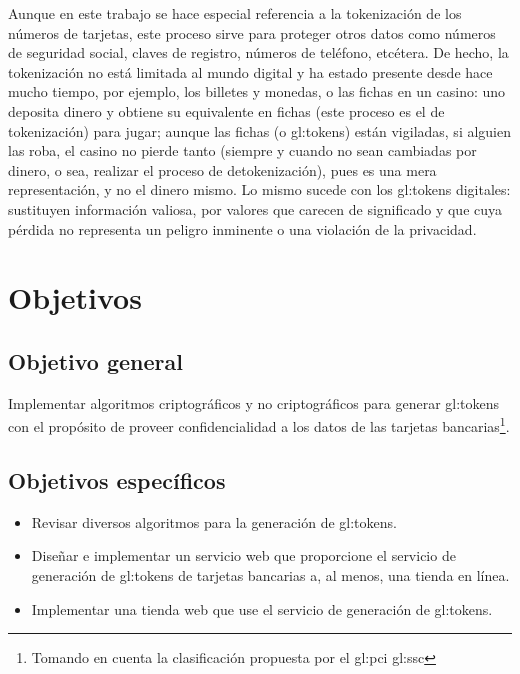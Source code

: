 Aunque en este trabajo se hace especial referencia a la tokenización de los
números de tarjetas, este proceso sirve para proteger otros datos como números
de seguridad social, claves de registro, números de teléfono, etcétera. De
hecho, la tokenización no está limitada al mundo digital y ha estado presente
desde hace mucho tiempo, por ejemplo, los billetes y monedas, o las fichas en
un casino: uno deposita dinero y obtiene su equivalente en fichas (este proceso
es el de tokenización) para jugar; aunque las fichas (o \glspl{gl:token}) están
vigiladas, si alguien las roba, el casino no pierde tanto (siempre y cuando no
sean cambiadas por dinero, o sea, realizar el proceso de detokenización), pues
es una mera representación, y no el dinero mismo. Lo mismo sucede con los
\glspl{gl:token} digitales: sustituyen información valiosa, por valores que
carecen de significado y que cuya pérdida no representa un peligro inminente o
una violación de la privacidad.

\section{Objetivos}

\subsection{Objetivo general}

Implementar algoritmos criptográficos y no criptográficos para generar
\glspl{gl:token} con el propósito de proveer confidencialidad a los datos de las
tarjetas bancarias\footnote{Tomando en cuenta la clasificación propuesta por el
\gls{gl:pci} \gls{gl:ssc}}.

\subsection{Objetivos específicos}

\begin{itemize}
  \item Revisar diversos algoritmos para la generación de \glspl{gl:token}.
  \item Diseñar e implementar un servicio web que proporcione el servicio de
    generación de \glspl{gl:token} de tarjetas bancarias a, al menos, una tienda
    en línea.
  \item Implementar una tienda web que use el servicio de generación de
    \glspl{gl:token}.
\end{itemize}

